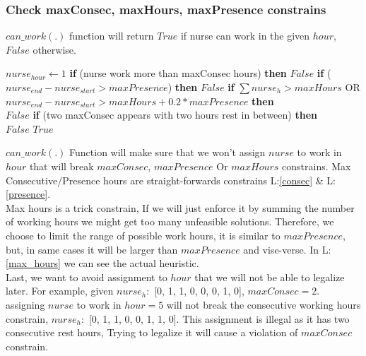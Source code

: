 \documentclass{article}
\newcommand\tab[1][1cm]{\hspace*{#1}}
\begin{document}
	\subsubsection{Check maxConsec, maxHours, maxPresence constrains}
\tab $can\_work(.)$ function will return $True$ if nurse can work in the given $hour$, $False$ otherwise.
	\begin{algorithmic}[1]
	    \State $nurse_{hour} \leftarrow 1$
	    \State \textbf{if} (nurse work more than maxConsec hours) \textbf{then} \Return $False$ \label{consec}
	    \State \textbf{if} ($nurse_{end} - nurse_{start} > maxPresence $) \textbf{then} \Return $False$ \label{presence}
	    \State \textbf{if} $\sum{nurse_h} > maxHours$ OR \label{max_hours}
	    \\\tab $nurse_{end} - nurse_{start} > maxHours + 0.2*maxPresence $ \textbf{then} 
	    \\\tab \Return $False$
	    \State \textbf{if} (two maxConsec appears with two hours rest in between) \textbf{then} \label{consec_rest}
	    \\\tab \Return $False$
	    \State \Return $True$
	\EndFunction
	\end{algorithmic}
\tab \textbf{$can\_work(.)$} Function will make sure that we won't assign $nurse$ to work in $hour$ that will break \textbf{$maxConsec$}, \textbf{$maxPresence$} Or \textbf{$maxHours$} constrains. Max Consecutive/Presence hours are straight-forwards constrains L:\ref{consec} \& L:\ref{presence}.\\ Max hours is a trick constrain, If we will just enforce it by summing the number of working hours we might get too many unfeasible solutions. Therefore, we choose to limit the range of possible work hours, it is similar to \textbf{$maxPresence$}, but, in same cases it will be larger than \textbf{$maxPresence$} and vise-verse. In L:\ref{max_hours} we can see the actual heuristic.
\\\tab Last, we want to avoid assignment to \textbf{$hour$} that we will not be able to legalize later. For example, given $nurse_h:$ {[}0, 1, 1, 0, 0, 0, 1, 0{]}, $maxConsec=2$. assigning $nurse$ to work in $hour=5$ will not break the consecutive working hours constrain, $nurse_h:$ {[}0, 1, 1, 0, 0, 1, 1, 0{]}. This assignment is illegal as it has two consecutive rest hours, Trying to legalize it will cause a violation of \textbf{$maxConsec$} constrain.
\end{document}

